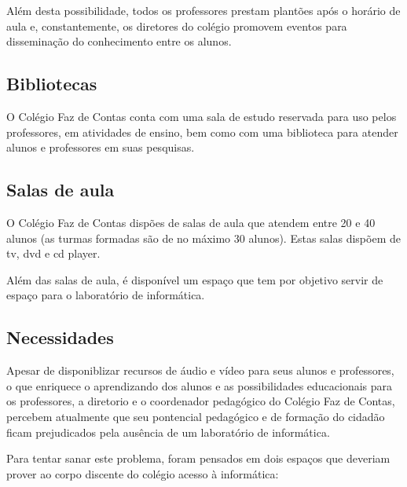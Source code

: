 \documentclass[a4paper,12pt]{report}
\begin{document}
            Além desta possibilidade, todos os professores prestam plantões
            após o horário de aula e, constantemente, os diretores do colégio
            promovem eventos para disseminação do conhecimento entre os
            alunos.

            \subsection{Bibliotecas}
            O Colégio Faz de Contas conta com uma sala de estudo reservada
            para uso pelos professores, em atividades de ensino, bem como com
            uma biblioteca para atender alunos e professores em suas pesquisas.

            \subsection{Salas de aula}
            O Colégio Faz de Contas dispões de salas de aula que atendem entre
            20 e 40 alunos (as turmas formadas são de no máximo 30 alunos).
            Estas salas dispõem de tv, dvd e cd player.

            Além das salas de aula, é disponível um espaço que tem por
            objetivo servir de espaço para o laboratório de informática.

            \subsection{Necessidades}
            Apesar de disponiblizar recursos de áudio e vídeo para seus alunos e
            professores, o que enriquece o aprendizando dos alunos e as
            possibilidades educacionais para os professores, a diretorio e o
            coordenador pedagógico do Colégio Faz de Contas, percebem atualmente
            que seu pontencial pedagógico e de formação do cidadão ficam
            prejudicados pela ausência de um laboratório de informática.

            Para tentar sanar este problema, foram pensados em dois espaços que
            deveriam prover ao corpo discente do colégio acesso à informática:
\end{document}
